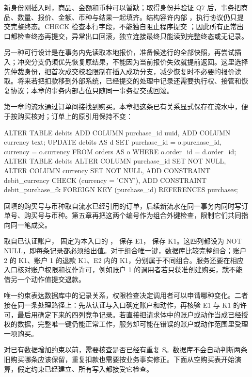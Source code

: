 新身份刚插入时，商品、金额和币种可以暂缺；取得身份并验证 Q7 后，事务把商品、数量、报价、金额、币种与结果一起填齐。结构容许内部 ，执行协议仍只提交完整终态。CHECK 检查本行字段，不能独自阻止程序提交 ；因此所有正常出口都检查终态再提交，异常出口回滚，独立连接最终只能读到完整终态或无记录。

另一种可行设计是在事务内先读取本地报价，准备候选行的全部快照，再尝试插入；冲突分支仍须优先恢复原结果，不能因为当前报价失效就提前返回。这里选择先仲裁身份，把首次成交校验限制在插入成功分支，减少恢复时不必要的报价读取。将来若把扣款移到外部系统，已经提交的处理中记录还需要执行权、接管和恢复协议；本章的事务内部占位只随同一事务提交或回滚。

第一章的流水通过订单间接找到购买。本章把这条已有关系显式保存在流水中，便于按购买核对；订单上的原引用保持不变：

\begin{BookCode}
ALTER TABLE debits
  ADD COLUMN purchase_id uuid,
  ADD COLUMN currency text;
UPDATE debits AS d
SET purchase_id = o.purchase_id, currency = o.currency
FROM orders AS o WHERE o.order_id = d.order_id;
ALTER TABLE debits
  ALTER COLUMN purchase_id SET NOT NULL,
  ALTER COLUMN currency SET NOT NULL,
  ADD CONSTRAINT debit_currency CHECK (currency = 'CNY'),
  ADD CONSTRAINT debit_purchase_fk
    FOREIGN KEY (purchase_id) REFERENCES purchases;
\end{BookCode}

回填的购买号与币种取自流水已经引用的订单，后续新流水在同一事务内同时写订单号、购买号与币种。第五章再把这两个编号作为组合外键检查，限制它们共同指向同一笔成交。

 取自已认证账户， 固定为本入口的 ， 保存 E1， 保存 K1。这四列都设为 NOT NULL，即每条记录都必须给出值。对于组合唯一键，数据库比较完整组合；账户 2 的 K1、账户 1 的退款 K1、E2 内的 K1，分别属于不同组合。服务还要在相应入口核对账户权限和操作许可，例如账户 1 的调用者若只获准创建购买，就不能借另一个动作值提交退款。



唯一约束表达数据库中的记录关系，权限检查决定调用者可以申请哪种变化。二者接在同一条处理路径上：先从认证与入口确定账户和动作，再核验 E1 与 K1 的许可，最后用确定下来的四列竞争记录。若直接把请求体中的账户或动作当成已经授权的数据，完整唯一键仍能正常工作，服务却可能在错误的账户或动作范围里受理一项购买。

对已有数据增加约束以前，需要核查是否已经有重复 S。数据库不会自动判断两条旧购买哪条应该保留，重复扣款也需要按业务事实修正。下面从空购买表开始演算，假定约束已经建立、所有写入都接受它检查。


